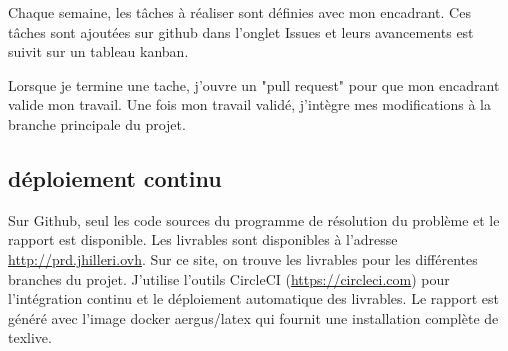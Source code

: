Chaque semaine, les tâches à réaliser sont définies avec mon encadrant.
Ces tâches sont ajoutées sur github dans l'onglet Issues et leurs avancements est suivit sur un tableau kanban.

Lorsque je termine une tache, j'ouvre un "pull request" pour que mon encadrant valide mon travail.
Une fois mon travail validé, j'intègre mes modifications à la branche principale du projet.

\subsection{déploiement continu}
Sur Github, seul les code sources du programme de résolution du problème et le rapport est disponible.
Les livrables sont disponibles à l'adresse \url{http://prd.jhilleri.ovh}.
Sur ce site, on trouve les livrables pour les différentes branches du projet.
J'utilise l'outils CircleCI (\url{https://circleci.com}) pour l'intégration continu 
    et le déploiement automatique des livrables.
Le rapport est généré avec l'image docker aergus/latex qui fournit une installation complète de texlive.
